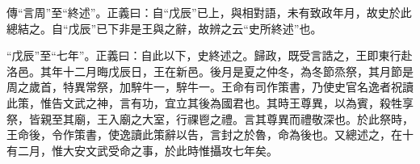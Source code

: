 {\noindent\zhuan{}\fzbyks 傳“言周”至“終述”。正義曰：自“戊辰”已上，與相對語，未有致政年月，故史於此總結之。自“戊辰”已下非是王與之辭，故辨之云“史所終述”也。 \par}

{\noindent\shu{}\fzkt “戊辰”至“七年”。正義曰：自此以下，史終述之。歸政，既受言誥之，王即東行赴洛邑。其年十二月晦戊辰日，王在新邑。後月是夏之仲冬，為冬節烝祭，其月節是周之歲首，特異常祭，加騂牛一，騂牛一。王命有司作策書，乃使史官名逸者祝讀此策，惟告文武之神，言有功，宜立其後為國君也。其時王尊異，以為賓，殺牲享祭，皆親至其廟，王入廟之大室，行祼鬯之禮。言其尊異而禮敬深也。於此祭時，王命後，令作策書，使逸讀此策辭以告，言封之於魯，命為後也。又總述之，在十有二月，惟大安文武受命之事，於此時惟攝攻七年矣。 \par}

